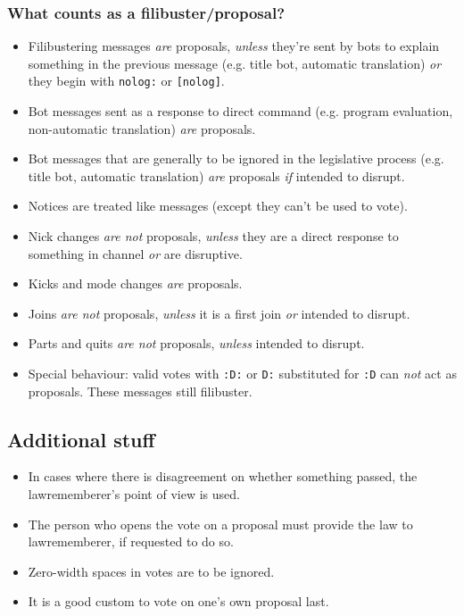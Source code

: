 \documentclass[11pt]{article}
\begin{document}
\subsubsection{What counts as a filibuster/proposal?}

\begin{itemize}
\item Filibustering messages \emph{are} proposals, \emph{unless} they're sent by 
bots to explain something in the previous message (e.g. title bot, automatic translation) 
\emph{or} they begin with \texttt{nolog:} or \texttt{[nolog]}.
\item Bot messages sent as a response to direct command (e.g. program evaluation,
non-automatic translation) \emph{are} proposals.
\item Bot messages that are generally to be ignored in the legislative process (e.g. title
bot, automatic translation) \emph{are} proposals \emph{if} intended to disrupt.
\item Notices are treated like messages (except they can't be used to vote).
\item Nick changes \emph{are not} proposals, \emph{unless} they are a direct response
to something in channel \emph{or} are disruptive.
\item Kicks and mode changes \emph{are} proposals.
\item Joins \emph{are not} proposals, \emph{unless} it is a first join \emph{or} intended
to disrupt.
\item Parts and quits \emph{are not} proposals, \emph{unless} intended to disrupt.
\item Special behaviour: valid votes with \texttt{:D:} or \texttt{D:} substituted for \texttt{:D}
can \emph{not} act as proposals. These messages still filibuster.
\end{itemize}


\subsection{Additional stuff}

\begin{itemize}
\item In cases where there is disagreement on whether something passed, the
lawrememberer's point of view is used.
\item The person who opens the vote on a proposal must provide the law to lawrememberer,
if requested to do so.
\item Zero-width spaces in votes are to be ignored.
\item It is a good custom to vote on one's own proposal last.
\end{itemize}
\end{document}
